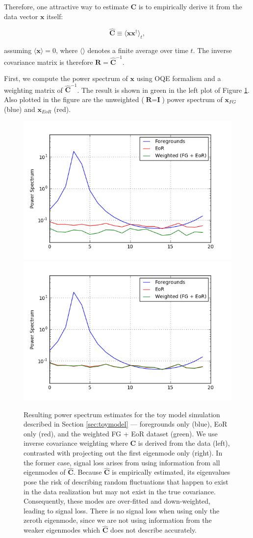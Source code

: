 \documentclass[preprint2,numberedappendix,tighten]{aastex6}  %
\begin{document}
Therefore, one attractive way to estimate $\textbf{C}$ is to empirically derive it from the data vector $\textbf{x}$ itself:

\begin{equation}
\hat{\textbf{C}} \equiv \langle\textbf{xx}^{\dagger}\rangle_{t},
\end{equation}

\noindent assuming $\langle\textbf{x}\rangle = 0$, where $\langle \rangle$ denotes a finite average over time $t$. The inverse covariance matrix is therefore $\textbf{R} = \hat{\textbf{C}}^{-1}$. 

First, we compute the power spectrum of $\textbf{x}$ using OQE formalism and a weighting matrix of $\hat{\textbf{C}}^{-1}$. The result is shown in green in the left plot of Figure \ref{fig:toy_sigloss3}. Also plotted in the figure are the unweighted ($\textbf{R} = \textbf{I}$) power spectrum of $\textbf{x}_{FG}$ (blue) and $\textbf{x}_{EoR}$ (red). 

\begin{figure}
	\centering
	\includegraphics[trim={0.3cm 0.2cm 1cm 0.3cm},clip,height=0.3\textwidth]{plots/toy_sigloss3.png}
	\includegraphics[trim={1cm 0.2cm 0cm 0.3cm},clip,height=0.3\textwidth]{plots/toy_sigloss4.png}
	\caption{Resulting power spectrum estimates for the toy model simulation described in Section \ref{sec:toymodel} --- foregrounds only (blue), EoR only (red), and the weighted FG + EoR dataset (green). We use inverse covariance weighting where $\textbf{C}$ is derived from the data (left), contrasted with projecting out the first eigenmode only (right). In the former case, signal loss arises from using information from all eigenmodes of $\hat{\textbf{C}}$. Because $\hat{\textbf{C}}$ is empirically estimated, its eigenvalues pose the risk of describing random fluctuations that happen to exist in the data realization but may not exist in the true covariance. Consequently, these modes are over-fitted and down-weighted, leading to signal loss. There is no signal loss when using only the zeroth eigenmode, since we are not using information from the weaker eigenmodes which $\hat{\textbf{C}}$ does not describe accurately.}
	\label{fig:toy_sigloss3}
\end{figure}
\end{document}
